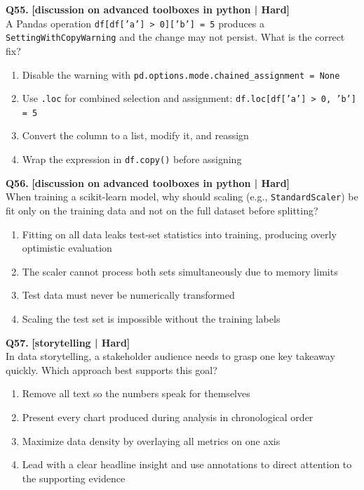 \noindent\textbf{Q55.} \hfill {\small\color{LPUOrange}\textbf{[discussion on advanced toolboxes in python | Hard]}}\\[2pt]
A Pandas operation \texttt{df[df['a'] > 0]['b'] = 5} produces a \texttt{SettingWithCopyWarning} and the change may not persist. What is the correct fix?

\begin{enumerate}[label=(\alph*),topsep=2pt,itemsep=1pt,partopsep=0pt,parsep=0pt]
    \item \relax Disable the warning with \texttt{pd.options.mode.chained\_assignment = None}
    \item \relax Use \texttt{.loc} for combined selection and assignment: \texttt{df.loc[df['a'] > 0, 'b'] = 5}
    \item \relax Convert the column to a list, modify it, and reassign
    \item \relax Wrap the expression in \texttt{df.copy()} before assigning
\end{enumerate}
\vspace{2mm}

\noindent\textbf{Q56.} \hfill {\small\color{LPUOrange}\textbf{[discussion on advanced toolboxes in python | Hard]}}\\[2pt]
When training a scikit-learn model, why should scaling (e.g., \texttt{StandardScaler}) be fit only on the training data and not on the full dataset before splitting?

\begin{enumerate}[label=(\alph*),topsep=2pt,itemsep=1pt,partopsep=0pt,parsep=0pt]
    \item \relax Fitting on all data leaks test-set statistics into training, producing overly optimistic evaluation
    \item \relax The scaler cannot process both sets simultaneously due to memory limits
    \item \relax Test data must never be numerically transformed
    \item \relax Scaling the test set is impossible without the training labels
\end{enumerate}
\vspace{2mm}

\noindent\textbf{Q57.} \hfill {\small\color{LPUOrange}\textbf{[storytelling | Hard]}}\\[2pt]
In data storytelling, a stakeholder audience needs to grasp one key takeaway quickly. Which approach best supports this goal?

\begin{enumerate}[label=(\alph*),topsep=2pt,itemsep=1pt,partopsep=0pt,parsep=0pt]
    \item \relax Remove all text so the numbers speak for themselves
    \item \relax Present every chart produced during analysis in chronological order
    \item \relax Maximize data density by overlaying all metrics on one axis
    \item \relax Lead with a clear headline insight and use annotations to direct attention to the supporting evidence
\end{enumerate}
\vspace{2mm}

